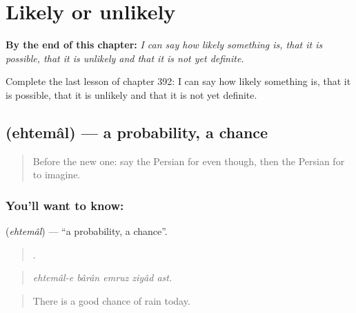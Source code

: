 
\chapter{Likely or unlikely}
\label{ch:fa-likely-or-unlikely}

\begin{chapteropening}
\textbf{By the end of this chapter:} \emph{I can say how likely something is, that it is possible, that it is unlikely and that it is not yet definite.}

Complete the last lesson of chapter 392: I can say how likely something is, that it is possible, that it is unlikely and that it is not yet definite.
\end{chapteropening}

\section[\texorpdfstring{\fa{احتمال} (ehtemâl)}{احتمال (ehtemâl)}]{ (ehtemâl) — a probability, a chance}

\label{lesson:FA-C392-ehtemal}



\begin{quote}
Before the new one: say the Persian for even though, then the Persian for to imagine.
\end{quote}

\subsection*{You'll want to know: }
\textbf{} (\emph{ehtemâl}) — \textquotedblleft{}a probability, a chance\textquotedblright{}.

\begin{quote}
    .
\end{quote}

\begin{quote}
\emph{ehtemâl-e bârân emruz ziyâd ast.}
\end{quote}

\begin{quote}
There is a good chance of rain today.
\end{quote}

